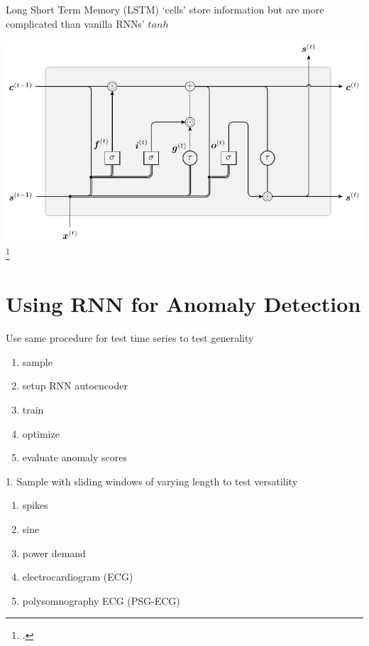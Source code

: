 \documentclass{beamer}
\begin{document}
    \begin{frame}{Long Short Term Memory (LSTM) `cells' store information but are more complicated than vanilla RNNs' $tanh$}

      \includegraphics[width=\textwidth]{figs/lstm.pdf}
      \footcite{Colah2015}
    \end{frame}



    \section{Using RNN for Anomaly Detection}

    \begin{frame}{Use same procedure for test time series to test generality}
      
      \begin{enumerate}
      \item sample
      \item setup RNN autoencoder
      \item train
      \item optimize
      \item evaluate anomaly scores
      \end{enumerate}

    \end{frame}


    \begin{frame}{1. Sample with sliding windows of varying length to test versatility}
      
      \begin{enumerate}
      \item spikes
      \item sine
      \item power demand
      \item electrocardiogram (ECG)
      \item polysomnography ECG (PSG-ECG)
      \end{enumerate}

    \end{frame}
\end{document}
